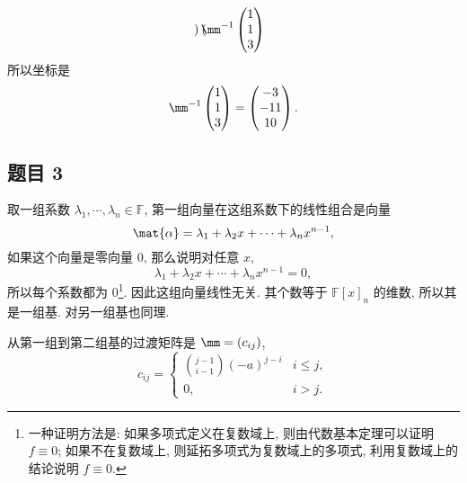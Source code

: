 \begin{solution}
\begin{enumerate}
\[\begin{pmatrix}
        \end{pmatrix}\mm^{-1}
        \begin{pmatrix}
            1 \\ 1 \\ 3
        \end{pmatrix}
    \]
    所以坐标是
    \[
        \mm^{-1}
        \begin{pmatrix}
            1 \\ 1 \\ 3
        \end{pmatrix} = 
        \left(\begin{matrix}
            -3 \\ -11 \\ 10
        \end{matrix}\right).
    \]
\end{enumerate}
\end{solution}

\subsection*{ 题目 3 }
\begin{solution}
取一组系数 $\lambda_1, \cdots, \lambda_n \in \mathbb{F}$, 第一组向量在这组系数下的线性组合是向量
\[
\mat{\alpha} = \lambda_1 + \lambda_2 x + \cdots + \lambda_n x^{n - 1},
\]
如果这个向量是零向量 $0$, 那么说明对任意 $x$,
\[
    \lambda_1 + \lambda_2 x + \cdots + \lambda_n x^{n - 1} = 0,
\]
所以每个系数都为 $0$\footnote{一种证明方法是: 如果多项式定义在复数域上, 则由代数基本定理可以证明 $f \equiv 0$; 如果不在复数域上, 则延拓多项式为复数域上的多项式, 利用复数域上的结论说明 $f \equiv 0$.}. 因此这组向量线性无关. 其个数等于 $\mathbb{F}[x]_n$ 的维数, 所以其是一组基. 对另一组基也同理.

从第一组到第二组基的过渡矩阵是 $\mm = (c_{ij})$, 
\[c_{ij} = 
\begin{cases}
    \binom{j - 1}{i - 1}(-a)^{j - i} & i \leqslant j, \\
    0, & i > j.
\end{cases}
\]
\end{solution}

